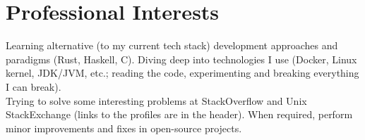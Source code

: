 \documentclass[letterpaper, 11pt]{article}
\begin{document}
    \section{Professional Interests}

    Learning alternative (to my current tech stack) development approaches and paradigms (Rust, Haskell, C). Diving deep into technologies I use (Docker, Linux kernel, JDK/JVM, etc.; reading the code, experimenting and breaking everything I can break). \\

    \noindent
    Trying to solve some interesting problems at StackOverflow and Unix StackExchange (links to the profiles are in the header). When required, perform minor improvements and fixes in open-source projects.
\end{document}

